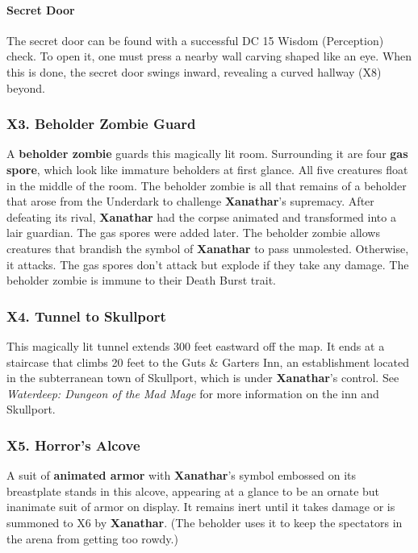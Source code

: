 \documentclass[10pt,a4paper,twoside,twocolumn,openany,nodeprecatedcode]{dndbook}
\begin{document}
\paragraph{Secret Door}
The secret door can be found with a successful DC 15 Wisdom (Perception) check. To open it, one must press a nearby wall carving shaped like an eye. When this is done, the secret door swings inward, revealing a curved hallway (X8) beyond.
\subsubsection{X3. Beholder Zombie Guard}
A \textbf{beholder zombie} guards this magically lit room. Surrounding it are four \textbf{gas spore}, which look like immature beholders at first glance. All five creatures float in the middle of the room.
The beholder zombie is all that remains of a beholder that arose from the Underdark to challenge \textbf{Xanathar}'s supremacy. After defeating its rival, \textbf{Xanathar} had the corpse animated and transformed into a lair guardian. The gas spores were added later.
The beholder zombie allows creatures that brandish the symbol of \textbf{Xanathar} to pass unmolested. Otherwise, it attacks. The gas spores don't attack but explode if they take any damage. The beholder zombie is immune to their Death Burst trait.
\subsubsection{X4. Tunnel to Skullport}
This magically lit tunnel extends 300 feet eastward off the map. It ends at a staircase that climbs 20 feet to the Guts \& Garters Inn, an establishment located in the subterranean town of Skullport, which is under \textbf{Xanathar}'s control. See \textit{Waterdeep: Dungeon of the Mad Mage} for more information on the inn and Skullport.
\subsubsection{X5. Horror's Alcove}
A suit of \textbf{animated armor} with \textbf{Xanathar}'s symbol embossed on its breastplate stands in this alcove, appearing at a glance to be an ornate but inanimate suit of armor on display. It remains inert until it takes damage or is summoned to X6 by \textbf{Xanathar}. (The beholder uses it to keep the spectators in the arena from getting too rowdy.)
\end{document}
